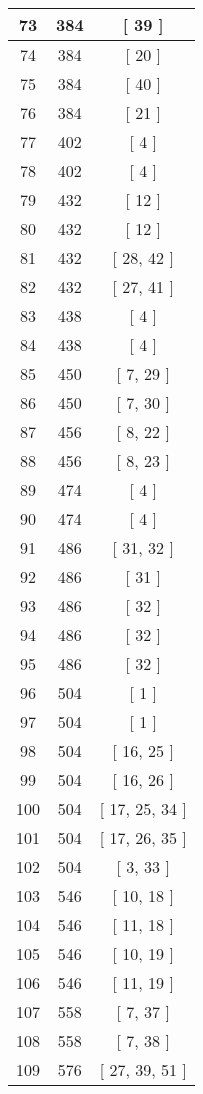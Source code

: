 \begin{center}
\begin{longtable}[H]{|| c c c ||}
\hline
73 & 384 & [ 39 ] \\ 
\hline
74 & 384 & [ 20 ] \\ 
\hline
75 & 384 & [ 40 ] \\ 
\hline
76 & 384 & [ 21 ] \\ 
\hline
77 & 402 & [ 4 ] \\ 
\hline
78 & 402 & [ 4 ] \\ 
\hline
79 & 432 & [ 12 ] \\ 
\hline
80 & 432 & [ 12 ] \\ 
\hline
81 & 432 & [ 28, 42 ] \\ 
\hline
82 & 432 & [ 27, 41 ] \\ 
\hline
83 & 438 & [ 4 ] \\ 
\hline
84 & 438 & [ 4 ] \\ 
\hline
85 & 450 & [ 7, 29 ] \\ 
\hline
86 & 450 & [ 7, 30 ] \\ 
\hline
87 & 456 & [ 8, 22 ] \\ 
\hline
88 & 456 & [ 8, 23 ] \\ 
\hline
89 & 474 & [ 4 ] \\ 
\hline
90 & 474 & [ 4 ] \\ 
\hline
91 & 486 & [ 31, 32 ] \\ 
\hline
92 & 486 & [ 31 ] \\ 
\hline
93 & 486 & [ 32 ] \\ 
\hline
94 & 486 & [ 32 ] \\ 
\hline
95 & 486 & [ 32 ] \\ 
\hline
96 & 504 & [ 1 ] \\ 
\hline
97 & 504 & [ 1 ] \\ 
\hline
98 & 504 & [ 16, 25 ] \\ 
\hline
99 & 504 & [ 16, 26 ] \\ 
\hline
100 & 504 & [ 17, 25, 34 ] \\ 
\hline
101 & 504 & [ 17, 26, 35 ] \\ 
\hline
102 & 504 & [ 3, 33 ] \\ 
\hline
103 & 546 & [ 10, 18 ] \\ 
\hline
104 & 546 & [ 11, 18 ] \\ 
\hline
105 & 546 & [ 10, 19 ] \\ 
\hline
106 & 546 & [ 11, 19 ] \\ 
\hline
107 & 558 & [ 7, 37 ] \\ 
\hline
108 & 558 & [ 7, 38 ] \\ 
\hline
109 & 576 & [ 27, 39, 51 ] \\ 

\end{longtable}
\end{center}
